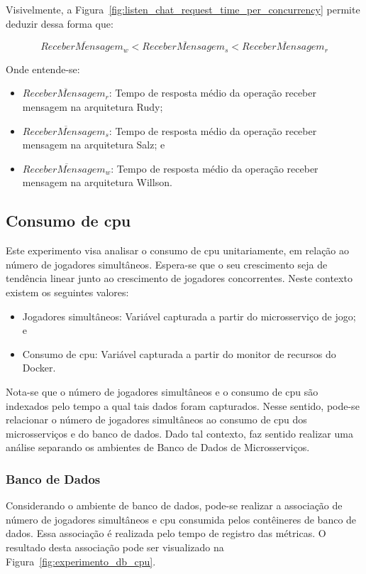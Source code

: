 Visivelmente, a Figura~\ref{fig:listen_chat_request_time_per_concurrency} permite deduzir dessa forma que:

$$
  \overline{ReceberMensagem_{w}} < \overline{ReceberMensagem_{s}} <\overline{ReceberMensagem_{r}}
$$

Onde entende-se:

\begin{itemize}
 \item $\overline{ReceberMensagem_{r}}$: Tempo de resposta médio da operação receber mensagem na arquitetura Rudy;
 \item $\overline{ReceberMensagem_{s}}$: Tempo de resposta médio da operação receber mensagem na arquitetura Salz; e
 \item $\overline{ReceberMensagem_{w}}$: Tempo de resposta médio da operação receber mensagem na arquitetura Willson.
\end{itemize}

\subsection{Consumo de \ac{cpu}}

Este experimento visa analisar o consumo de \ac{cpu} unitariamente, em relação ao número de jogadores simultâneos.
%
Espera-se que o seu crescimento seja de tendência linear junto ao crescimento de jogadores concorrentes.
%
Neste contexto existem os seguintes valores:

\begin{itemize}
    \item Jogadores simultâneos: Variável capturada a partir do microsserviço de jogo; e
    \item Consumo de \ac{cpu}: Variável capturada a partir do monitor de recursos do Docker.
\end{itemize}

Nota-se que o número de jogadores simultâneos e o consumo de \ac{cpu} são indexados pelo tempo a qual tais dados foram capturados.
%
Nesse sentido, pode-se relacionar o número de jogadores simultâneos ao consumo de \ac{cpu} dos microsserviços e do banco de dados.
%
Dado tal contexto, faz sentido realizar uma análise separando os ambientes de Banco de Dados de Microsserviços.

\subsubsection{Banco de Dados}

Considerando o ambiente de banco de dados, pode-se realizar a associação de número de jogadores simultâneos e \ac{cpu} consumida pelos contêineres de banco de dados.
%
Essa associação é realizada pelo tempo de registro das métricas.
%
O resultado desta associação pode ser visualizado na Figura~\ref{fig:experimento_db_cpu}.



